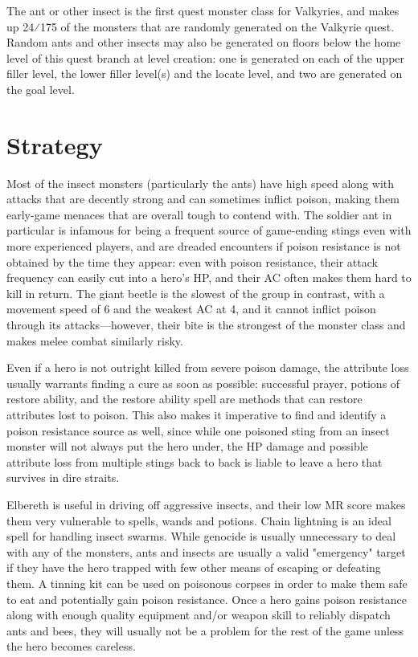 The ant or other insect is the first quest monster class for Valkyries, and makes up 24⁄175 of the monsters that are randomly generated on the Valkyrie quest. Random ants and other insects may also be generated on floors below the home level of this quest branch at level creation: one is generated on each of the upper filler level, the lower filler level(s) and the locate level, and two are generated on the goal level.

\section{Strategy}
Most of the insect monsters (particularly the ants) have high speed along with attacks that are decently strong and can sometimes inflict poison, making them early-game menaces that are overall tough to contend with. The soldier ant in particular is infamous for being a frequent source of game-ending stings even with more experienced players, and are dreaded encounters if poison resistance is not obtained by the time they appear: even with poison resistance, their attack frequency can easily cut into a hero's HP, and their AC often makes them hard to kill in return. The giant beetle is the slowest of the group in contrast, with a movement speed of 6 and the weakest AC at 4, and it cannot inflict poison through its attacks—however, their bite is the strongest of the monster class and makes melee combat similarly risky.

Even if a hero is not outright killed from severe poison damage, the attribute loss usually warrants finding a cure as soon as possible: successful prayer, potions of restore ability, and the restore ability spell are methods that can restore attributes lost to poison. This also makes it imperative to find and identify a poison resistance source as well, since while one poisoned sting from an insect monster will not always put the hero under, the HP damage and possible attribute loss from multiple stings back to back is liable to leave a hero that survives in dire straits.

Elbereth is useful in driving off aggressive insects, and their low MR score makes them very vulnerable to spells, wands and potions. Chain lightning is an ideal spell for handling insect swarms. While genocide is usually unnecessary to deal with any of the monsters, ants and insects are usually a valid "emergency" target if they have the hero trapped with few other means of escaping or defeating them. A tinning kit can be used on poisonous corpses in order to make them safe to eat and potentially gain poison resistance. Once a hero gains poison resistance along with enough quality equipment and/or weapon skill to reliably dispatch ants and bees, they will usually not be a problem for the rest of the game unless the hero becomes careless.

